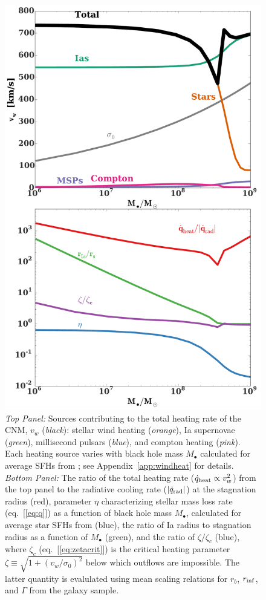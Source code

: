 \documentclass[usenatbib,fleqn]{mn2e}
\newcommand{\Mbh}[1][]{M_{\bullet#1}}
\newcommand{\rinf}{r_{\rm inf}}
\newcommand{\vwO}{v_{w}}
\begin{document}
\begin{figure}
\includegraphics[width=\columnwidth]{vwSources.pdf}
\caption{\label{fig:vwSources} {\it Top Panel:} Sources contributing
  to the total heating rate of the CNM, $\vwO$ ({\it black}): stellar
  wind heating ({\it orange}), Ia supernovae ({\it green}),
  millisecond pulsars ({\it blue}), and compton heating ({\it pink}).
  Each heating source varies with black hole mass $\Mbh$ calculated
  for average SFHs from \citet{MosterNaab+:2013a}; see
  Appendix~\ref{app:windheat} for details.  {\it Bottom Panel:} The
  ratio of the total heating rate ($\dot{q}_{\rm heat} \propto
  v_{w}^{2}$) from the top panel to the radiative cooling rate
  ($|\dot{q}_{\rm rad}|$) at the stagnation radius (red), parameter
  $\eta$ characterizing stellar mass loss rate (eq.~[\ref{eq:q}]) as a
  function of black hole mass $\Mbh$, calculated for average star SFHs
  from \citealt{MosterNaab+:2013a} (blue), the ratio of Ia radius to
  stagnation radius as a function of $\Mbh$ (green), and the ratio of $\zeta/\zeta_{c}$ (blue), where $\zeta_c$ (eq.~[\ref{eq:zetacrit}]) is the critical heating parameter $\zeta \equiv \sqrt{1+(v_w/\sigma_0)^2}$ below which outflows are impossible.  The latter quantity is evalulated using mean scaling relations for $r_b$, $\rinf$, and $\Gamma$ from the \citet{LauerFaber+:2007a} galaxy sample.}


\end{figure}
\end{document}
